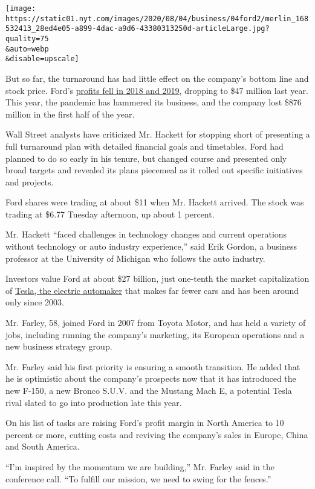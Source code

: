 \texttt{[image: https://static01.nyt.com/images/2020/08/04/business/04ford2/merlin\_168532413\_28ed4e05-a899-4dac-a9d6-43380313250d-articleLarge.jpg?quality=75\\\&auto=webp\\\&disable=upscale]}

But so far, the turnaround has had little effect on the company's bottom
line and stock price. Ford's
\href{https://s23.q4cdn.com/799033206/files/doc_financials/quarterly/2019/q4/Ford-4Q2019-Earnings-Press-Release.pdf}{profits
fell in 2018 and 2019}, dropping to \$47 million last year. This year,
the pandemic has hammered its business, and the company lost \$876
million in the first half of the year.

Wall Street analysts have criticized Mr. Hackett for stopping short of
presenting a full turnaround plan with detailed financial goals and
timetables. Ford had planned to do so early in his tenure, but changed
course and presented only broad targets and revealed its plans piecemeal
as it rolled out specific initiatives and projects.

Ford shares were trading at about \$11 when Mr. Hackett arrived. The
stock was trading at \$6.77 Tuesday afternoon, up about 1 percent.

Mr. Hackett ``faced challenges in technology changes and current
operations without technology or auto industry experience,'' said Erik
Gordon, a business professor at the University of Michigan who follows
the auto industry.

Investors value Ford at about \$27 billion, just one-tenth the market
capitalization of
\href{https://www.nytimes.com/topic/company/tesla-motors-inc}{Tesla, the
electric automaker} that makes far fewer cars and has been around only
since 2003.

Mr. Farley, 58, joined Ford in 2007 from Toyota Motor, and has held a
variety of jobs, including running the company's marketing, its European
operations and a new business strategy group.

Mr. Farley said his first priority is ensuring a smooth transition. He
added that he is optimistic about the company's prospects now that it
has introduced the new F-150, a new Bronco S.U.V. and the Mustang Mach
E, a potential Tesla rival slated to go into production late this year.

On his list of tasks are raising Ford's profit margin in North America
to 10 percent or more, cutting costs and reviving the company's sales in
Europe, China and South America.

``I'm inspired by the momentum we are building,'' Mr. Farley said in the
conference call. ``To fulfill our mission, we need to swing for the
fences.''

